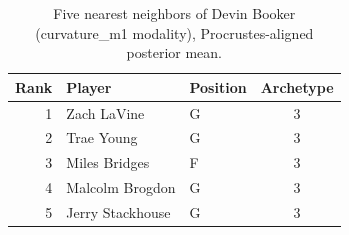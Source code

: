 \begin{table}[htbp]
  \centering\small
  \begin{tabular}{rllc}
    \toprule
    Rank & Player & Position & Archetype \\
    \midrule
    1 & Zach LaVine & G & 3 \\
    2 & Trae Young & G & 3 \\
    3 & Miles Bridges & F & 3 \\
    4 & Malcolm Brogdon & G & 3 \\
    5 & Jerry Stackhouse & G & 3 \\
    \bottomrule
  \end{tabular}
  \caption{Five nearest neighbors of Devin Booker (curvature_m1 modality), Procrustes-aligned posterior mean.}
  \label{tab:Devin_Booker_neighbors_curvature_m1}
\end{table}

